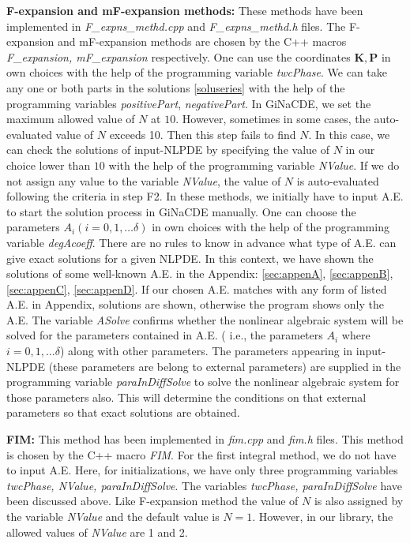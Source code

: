 \documentclass[prd,aps,floats,showkeys,nofootinbib,notitlepage]{revtex4}
\begin{document}
	\textbf{F-expansion and mF-expansion methods:} These methods have been implemented in \textit{F\_expns\_methd.cpp} and \textit{F\_expns\_methd.h} files.
	The F-expansion and mF-expansion methods are chosen by the C++ macros {\em F\_expansion, mF\_expansion} respectively. 
	One can use the coordinates $\boldsymbol{K},\boldsymbol{P}$ in own choices with the help of the programming variable \textit{twcPhase}.
	We can take any one or both parts in the solutions \eqref{soluseries} with the help of the programming variables \textit{positivePart}, \textit{negativePart}. In GiNaCDE, we set the maximum allowed value of $N$ at $10$. However, sometimes in some cases, the auto-evaluated value of $N$ exceeds 10. Then this step fails to find $N$.
	In this case, we can check the solutions of input-NLPDE by specifying the value of $N$ in our choice lower than $10$ with the help of the programming variable {\em NValue}. If we do not assign any value to the variable {\em NValue}, the value of $N$ is auto-evaluated following the criteria in step F2.
	In these methods, we initially have to input A.E. to start the solution process in GiNaCDE manually. One can choose the parameters $A_i(i=0,1,\ldots \delta)$ in own choices with the help of the programming variable \textit{degAcoeff}. There are no rules to know in advance what type of A.E. can give exact solutions for a given NLPDE. In this context, we have shown the solutions of some well-known A.E. in the Appendix: \ref{sec:appenA}, \ref{sec:appenB}, \ref{sec:appenC}, \ref{sec:appenD}. If our chosen A.E. matches with any form of listed A.E. in Appendix, solutions are shown, otherwise the program shows only the A.E.
	The variable {\em ASolve} confirms whether the nonlinear algebraic system will be solved for the parameters contained in A.E. ( i.e., the parameters $A_i$ where $i=0,1,\ldots \delta$) along with other parameters. The parameters appearing in input-NLPDE (these parameters are belong to external parameters) are supplied in the programming variable {\em paraInDiffSolve} to solve the nonlinear algebraic system for those parameters also.
	This will determine the conditions on that external parameters so that exact solutions are obtained.
	
	\textbf{FIM:} This method has been implemented in \textit{fim.cpp} and \textit{fim.h} files. This method is chosen by the C++ macro {\em FIM}. For the first integral method, we do not have to input A.E. Here, for initializations, we have only three programming variables \textit{twcPhase, NValue, paraInDiffSolve}. The variables \textit{twcPhase, paraInDiffSolve} have been discussed above. Like F-expansion method the value of $N$ is also assigned by the variable {\em NValue} and the default value is $N=1$. However, in our library, the allowed values of {\em NValue} are 1 and 2. 
	
\end{document}
